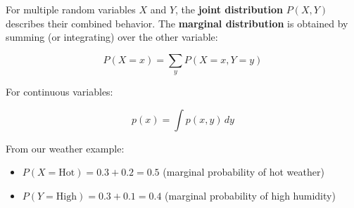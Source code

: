 For multiple random variables $X$ and $Y$, the \textbf{joint distribution} $P(X, Y)$ describes their combined behavior. The \textbf{marginal distribution} is obtained by summing (or integrating) over the other variable:

\begin{equation}
P(X=x) = \sum_{y} P(X=x, Y=y)
\end{equation}

For continuous variables:

\begin{equation}
p(x) = \int p(x, y) \, dy
\end{equation}

From our weather example:
\begin{itemize}
    \item $P(X=\text{Hot}) = 0.3 + 0.2 = 0.5$ (marginal probability of hot weather)
    \item $P(Y=\text{High}) = 0.3 + 0.1 = 0.4$ (marginal probability of high humidity)
\end{itemize}
